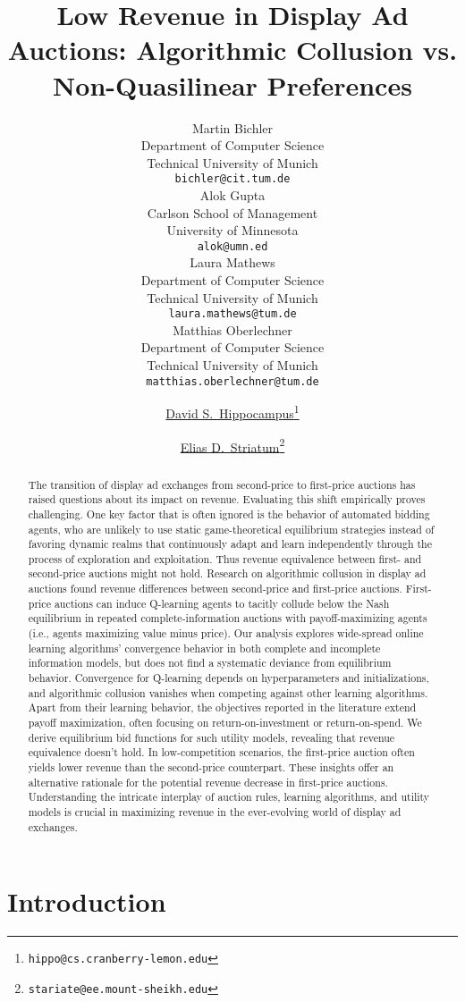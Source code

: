 \documentclass{article}
\title{Low Revenue in Display Ad Auctions: Algorithmic Collusion vs. Non-Quasilinear Preferences}
\author{
	Martin Bichler \\
	\small Department of Computer Science\\
	\small Technical University of Munich\\
	\small \texttt{bichler@cit.tum.de} \\
	\And
	 Alok Gupta\\
	\small Carlson School of Management\\
	\small University of Minnesota \\
	\small \texttt{alok@umn.ed} \\
	\AND
	Laura Mathews\\
	\small Department of Computer Science\\
	\small Technical University of Munich \\
	\small \texttt{laura.mathews@tum.de} \\
	\And 
	Matthias Oberlechner\\
	\small Department of Computer Science\\
	\small Technical University of Munich \\
	\small \texttt{matthias.oberlechner@tum.de}\\
}
\author[1]{%
	\href{https://orcid.org/0000-0000-0000-0000}{\usebox{\orcid}\hspace{1mm}David S.~Hippocampus\thanks{\texttt{hippo@cs.cranberry-lemon.edu}}}%
}
\author[1,2]{%
	\href{https://orcid.org/0000-0000-0000-0000}{\usebox{\orcid}\hspace{1mm}Elias D.~Striatum\thanks{\texttt{stariate@ee.mount-sheikh.edu}}}%
}
\affil[1]{Department of Computer Science, Cranberry-Lemon University, Pittsburgh, PA 15213}
\affil[2]{Department of Electrical Engineering, Mount-Sheikh University, Santa Narimana, Levand}
\begin{document}
\maketitle

\begin{abstract}
	The transition of display ad exchanges from second-price to first-price auctions has raised questions about its impact on revenue. Evaluating this shift empirically proves challenging. 
	One key factor that is often ignored is the behavior of automated bidding agents, who are unlikely to use static game-theoretical equilibrium strategies instead of favoring dynamic realms that continuously adapt and learn independently through the process of exploration and exploitation. Thus revenue equivalence between first- and second-price auctions might not hold. 
	Research on algorithmic collusion in display ad auctions found revenue differences between second-price and first-price auctions. First-price auctions can induce Q-learning agents to tacitly collude below the Nash equilibrium in repeated complete-information auctions with payoff-maximizing agents (i.e., agents maximizing value minus price).  
	Our analysis explores wide-spread online learning algorithms' convergence behavior in both complete and incomplete information models, but does not find a systematic deviance from equilibrium behavior. Convergence for Q-learning depends on hyperparameters and initializations, and algorithmic collusion vanishes when competing against other learning algorithms.  
	Apart from their learning behavior, the objectives reported in the literature extend payoff maximization, often focusing on return-on-investment or return-on-spend.  
	We derive equilibrium bid functions for such utility models, revealing that revenue equivalence doesn't hold. 
	In low-competition scenarios, the first-price auction often yields lower revenue than the second-price counterpart.  
	These insights offer an alternative rationale for the potential revenue decrease in first-price auctions. Understanding the intricate interplay of auction rules, learning algorithms, and utility models is crucial in maximizing revenue in the ever-evolving world of display ad exchanges.
\end{abstract}



\section{Introduction}\label{sec:intro}
\end{document}
